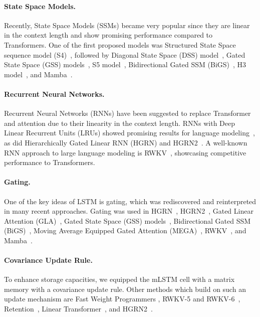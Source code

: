 \documentclass[dvipsnames]{article}
\begin{document}
\paragraph{State Space Models.}
Recently, State Space Models (SSMs) became very popular since they
are linear in the context length and show promising performance compared
to Transformers.
One of the first proposed models was 
Structured State Space sequence model (S4)~\citep{Gu:21}, followed by
Diagonal State Space (DSS) model~\citep{Gupta:22},
Gated State Space (GSS) models~\citep{Mehta:22},
S5 model~\citep{Smith:22}, 
Bidirectional Gated SSM (BiGS)~\citep{Wang:22},
H3 model~\citep{Fu:23},
and Mamba~\citep{Gu:24arxiv}.

\paragraph{Recurrent Neural Networks.}
Recurrent Neural Networks (RNNs) have been suggested to
replace Transformer and attention due to their linearity
in the context length.
RNNs with Deep Linear Recurrent Units (LRUs) showed
promising results for language modeling~\citep{Orvieto:23, De:24arxiv},
as did Hierarchically Gated Linear RNN (HGRN)
\citep{Qin:23} and HGRN2~\citep{Qin:24arxiv}.
A well-known RNN approach to large language modeling
is RWKV~\citep{Peng:23arxivshort,Peng:24arxivshort}, 
showcasing competitive performance to Transformers.

\paragraph{Gating.}
One of the key ideas of LSTM is gating, which
was rediscovered and reinterpreted in many recent approaches.
Gating was used in HGRN~\citep{Qin:23},
HGRN2~\citep{Qin:24arxiv}, Gated Linear Attention (GLA)~\citep{Yang:23arxiv},
Gated State Space (GSS) models~\citep{Mehta:22},
Bidirectional Gated SSM (BiGS)~\citep{Wang:22},
Moving Average Equipped Gated Attention (MEGA)~\citep{Ma:22},
RWKV~\citep{Peng:23arxivshort},
and Mamba~\citep{Gu:24arxiv}.

\paragraph{Covariance Update Rule.}
To enhance storage capacities, we equipped the mLSTM cell 
with a matrix memory with a covariance update rule.
Other methods which build on such an update mechanism are
Fast Weight Programmers 
\citep{Schmidhuber:92ncfastweights,Schlag:21},
RWKV-5 and RWKV-6~\citep{Peng:24arxivshort},
Retention~\citep{Sun:23arxiv},
Linear Transformer~\citep{Katharopoulos:20},
and HGRN2~\citep{Qin:24arxiv}.
\end{document}
